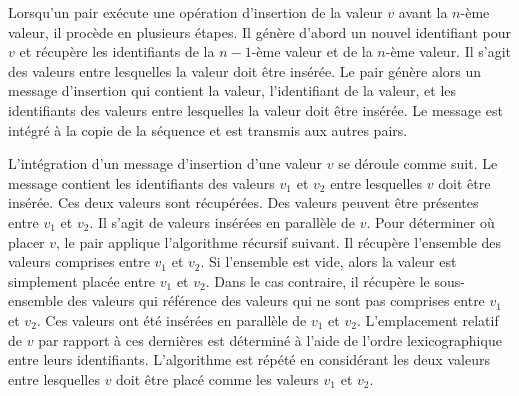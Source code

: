 Lorsqu'un pair exécute une opération d'insertion de la valeur $v$ avant la $n$-ème valeur, il procède en plusieurs étapes.
Il génère d'abord un nouvel identifiant pour $v$ et récupère les identifiants de la $n-1$-ème valeur et de la $n$-ème valeur.
Il s'agit des valeurs entre lesquelles la valeur doit être insérée.
Le pair génère alors un message d'insertion qui contient la valeur, l'identifiant de la valeur, et les identifiants des valeurs entre lesquelles la valeur doit être insérée.
Le message est intégré à la copie de la séquence et est transmis aux autres pairs.

L'intégration d'un message d'insertion d'une valeur $v$ se déroule comme suit.
Le message contient les identifiants des valeurs $v_1$ et $v_2$ entre lesquelles $v$ doit être insérée.
Ces deux valeurs sont récupérées.
Des valeurs peuvent être présentes entre $v_1$ et $v_2$.
Il s'agit de valeurs insérées en parallèle de $v$.
Pour déterminer où placer $v$, le pair applique l'algorithme récursif suivant.
Il récupère l'ensemble des valeurs comprises entre $v_1$ et $v_2$.
Si l'ensemble est vide, alors la valeur est simplement placée entre $v_1$ et $v_2$.
Dans le cas contraire, il récupère le sous-ensemble des valeurs qui référence des valeurs qui ne sont pas comprises entre $v_1$ et $v_2$.
Ces valeurs ont été insérées en parallèle de $v_1$ et $v_2$.
L'emplacement relatif de $v$ par rapport à ces dernières est déterminé à l'aide de l'ordre lexicographique entre leurs identifiants.
L'algorithme est répété en considérant les deux valeurs entre lesquelles $v$ doit être placé comme les valeurs $v_1$ et $v_2$.

